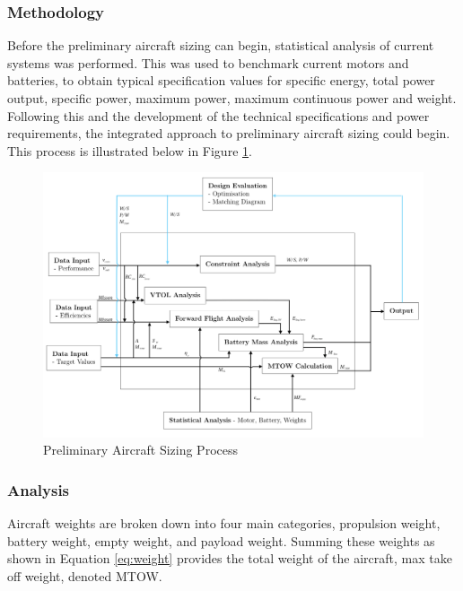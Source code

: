 \subsubsection{Methodology}
Before the preliminary aircraft sizing can begin, statistical analysis of current systems was performed. This was used to benchmark current motors and batteries, to obtain typical specification values for specific energy, total power output, specific power, maximum power, maximum continuous power and weight. Following this and the development of the technical specifications and power requirements, the integrated approach to preliminary aircraft sizing could begin. This process is illustrated below in Figure \ref{fig:meth}.        

 


\begin{figure}[H]
    \centering
    \includegraphics[width = 1\textwidth]{PrelimSizing/method.png}
    \caption{Preliminary Aircraft Sizing Process}
    \label{fig:meth}
\end{figure}

\subsubsection{Analysis}

Aircraft weights are broken down into four main categories, propulsion weight, battery weight, empty weight, and payload weight. Summing these weights as shown in Equation \ref{eq:weight} provides the total weight of the aircraft, max take off weight, denoted MTOW. 

